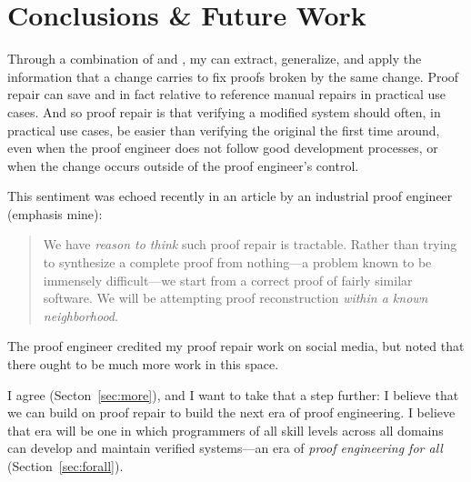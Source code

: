 \chapter{Conclusions \& Future Work}
\label{chapt:conclusions}

Through a combination of  and ,
my   can extract, generalize, and apply the information that a change carries to fix proofs broken by the same change.
Proof repair can save and in fact  relative to reference manual repairs in practical use cases.
And so proof repair is  that verifying a modified system should often, in practical use cases, be easier than verifying the original the first time around,
even when the proof engineer does not follow good development processes,
or when the change occurs outside of the proof engineer's control.

This sentiment was echoed recently in an article by an industrial proof engineer~\cite{article} (emphasis mine):

\begin{quote}
We have \textit{reason to think} such proof repair is tractable. Rather than trying to synthesize a complete proof from nothing---a problem known to be immensely difficult---we 
start from a correct proof of fairly similar software. We will be attempting proof reconstruction \textit{within a known neighborhood}.
\end{quote}
The proof engineer credited my proof repair work on social media, %
but noted that there ought to be much more work in this space.

I agree (Secton~\ref{sec:more}), and I want to take that a step further:
I believe that we can build on proof repair to build the next era of proof engineering.
I believe that era will be one in which programmers of all skill levels across all domains can develop and maintain verified systems---an
era of \textit{proof engineering for all} (Section~\ref{sec:forall}).



